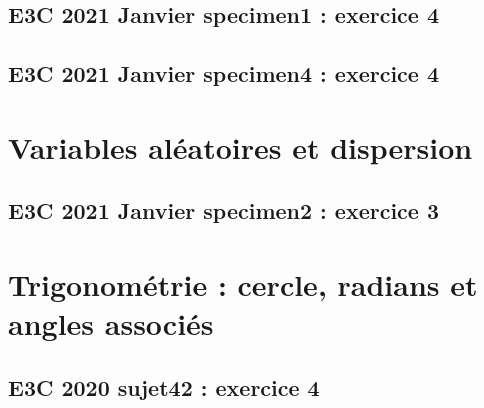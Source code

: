 \documentclass[lang=fr,edition=teacher,layout=sheet]{mxbook}
\begin{document}
\begingroup\endgroup
\par\bigskip
{}\subsection*{E3C 2021 Janvier specimen1 : exercice 4}
\begingroup\endgroup
\par\bigskip
{}\subsection*{E3C 2021 Janvier specimen4 : exercice 4}
\begingroup\endgroup
\par\bigskip
\clearpage\section*{Variables aléatoires et dispersion}
\subsection*{E3C 2021 Janvier specimen2 : exercice 3}
\begingroup\endgroup
\par\bigskip
\clearpage\section*{Trigonométrie : cercle, radians et angles associés}
\subsection*{E3C 2020 sujet42 : exercice 4}
\begingroup\endgroup
\par\bigskip
\end{document}
